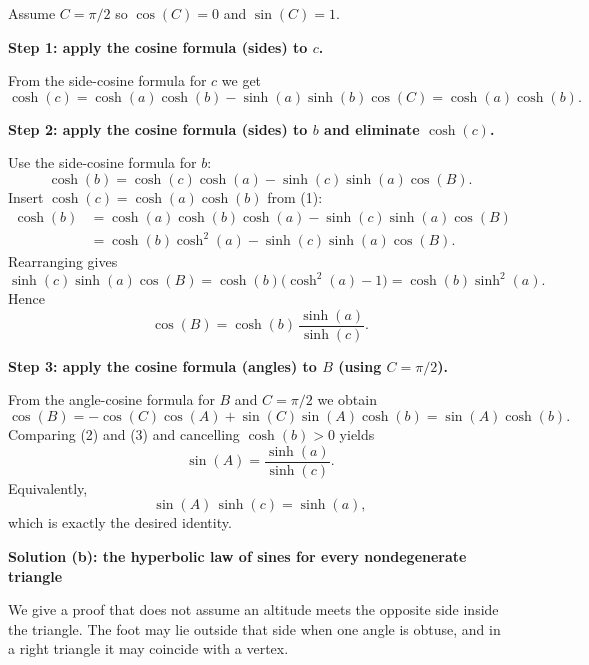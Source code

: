 \begin{solution}
Assume $C=\pi/2$ so $\cos(C)=0$ and $\sin(C)=1$.
	
	\par\medskip\noindent\textbf{Step 1: apply the cosine formula (sides) to $c$.}\par\smallskip

	From the side-cosine formula for $c$ we get
	\[
	\cosh(c)=\cosh(a)\cosh(b)-\sinh(a)\sinh(b)\cos(C)
	=\cosh(a)\cosh(b).
	\tag{1}
	\]
	
	\par\medskip\noindent\textbf{Step 2: apply the cosine formula (sides) to $b$ and eliminate $\cosh(c)$.}\par\smallskip

	Use the side-cosine formula for $b$:
	\[
	\cosh(b)=\cosh(c)\cosh(a)-\sinh(c)\sinh(a)\cos(B).
	\]
	Insert $\cosh(c)=\cosh(a)\cosh(b)$ from (1):
	\[
\begin{aligned}
\cosh(b)
&=\cosh(a)\cosh(b)\cosh(a)
  -\sinh(c)\sinh(a)\cos(B)\\
&=\cosh(b)\cosh^2(a)
  -\sinh(c)\sinh(a)\cos(B).
\end{aligned}
\]
	Rearranging gives
	\[
	\sinh(c)\sinh(a)\cos(B)=\cosh(b)\bigl(\cosh^2(a)-1\bigr)=\cosh(b)\sinh^2(a).
	\]
	Hence
	\[
	\cos(B)=\cosh(b)\,\frac{\sinh(a)}{\sinh(c)}.
	\tag{2}
	\]
	
	\par\medskip\noindent\textbf{Step 3: apply the cosine formula (angles) to $B$ (using $C=\pi/2$).}\par\smallskip

	From the angle-cosine formula for $B$ and $C=\pi/2$ we obtain
	\[
	\cos(B)=-\cos(C)\cos(A)+\sin(C)\sin(A)\cosh(b)=\sin(A)\cosh(b).
	\tag{3}
	\]
	Comparing (2) and (3) and cancelling $\cosh(b)>0$ yields
	\[
	\sin(A)=\frac{\sinh(a)}{\sinh(c)}.
	\]
	Equivalently,
	\[
	\sin(A)\,\sinh(c)=\sinh(a),
	\]
	which is exactly the desired identity.
	
	\par\medskip\noindent\textbf{Solution (b): the hyperbolic law of sines for every nondegenerate triangle}\par\smallskip

	We give a proof that does not assume an altitude meets the opposite
	side inside the triangle.  The foot may lie outside that side when
	one angle is obtuse, and in a right triangle it may coincide with
	a vertex.


\end{solution}
